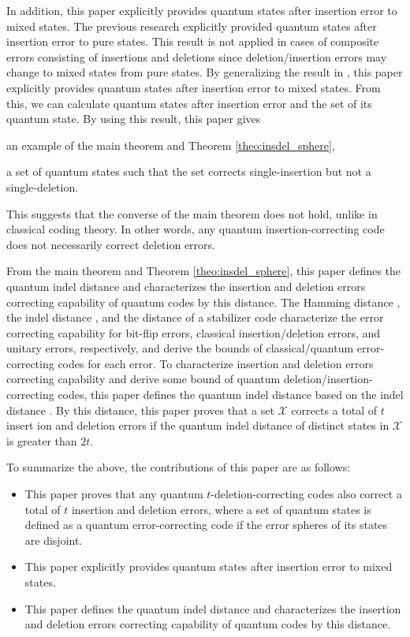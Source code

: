 \documentclass[reprint,amsmath,amssymb,aps,]{revtex4-2}
\theoremstyle{definition}
\newcommand{\1}{\mbox{1}\hspace{-0.25em}\mbox{l}}%
\newcommand{\QU}[1]{\mathcal{#1}}
\begin{document}
In addition,
this paper explicitly provides
quantum states after insertion error to mixed states.
The previous research \cite{sibayama_single_ins_def} 
explicitly provided
quantum states after insertion error to pure states.
This result is not applied
in cases of composite errors consisting of insertions and deletions
since 
deletion/insertion errors
may change
to mixed states
from pure states.
By generalizing the result in \cite{sibayama_single_ins_def},
this paper explicitly provides
quantum states after insertion error to mixed states.
From this,
we can calculate
quantum states after insertion error
and
the set of its quantum state.
By using this result,
this paper gives
\begin{enumerate*}[label={(\roman*)}]
\item an example of the main theorem and Theorem \ref{theo:insdel_sphere},
\item a set of quantum states
  such that
  the set corrects single-insertion
  but
  not a single-deletion.
\end{enumerate*}
This
suggests that
the converse of the main theorem
does not
hold,
unlike in classical coding theory.
In other words,
any quantum insertion-correcting code
does not necessarily
correct
deletion errors.

From the main theorem and Theorem \ref{theo:insdel_sphere},
this paper
defines
the quantum indel distance
and
characterizes the insertion and deletion errors correcting capability of quantum codes
by this distance. 
The Hamming distance \cite{hamming1950error},
the indel distance \cite{levenshtein1966binary}, and
the distance of a stabilizer code \cite{nielsen2016quantum}
characterize
the error correcting capability
for
bit-flip errors,
classical insertion/deletion errors,
and unitary errors,
respectively,
and
derive
the bounds of classical/quantum error-correcting codes
for each error.
To characterize insertion and deletion errors correcting capability
and
derive some bound of quantum deletion/insertion-correcting codes,
this paper
defines
the quantum indel distance
based on the indel distance \cite{levenshtein1966binary}.
By this distance,
this paper
proves that
a set $\QU{X}$ 
corrects
a total of $t$ insert
ion and deletion errors
if
the quantum indel distance of distinct states in $\QU{X}$ 
is
greater than $2t$.

To summarize the above,
the contributions of this paper
are
as follows:
\begin{itemize}
\item
  This paper
  proves that
  any quantum $t$-deletion-correcting codes
  also correct a total of $t$ insertion and deletion errors,
  where
  a set of quantum states is defined as a quantum error-correcting code
  if
  the error spheres of its states are disjoint.
\item  
  This paper explicitly provides
  quantum states after insertion error to mixed states.
\item
  This paper
  defines
  the quantum indel distance
  and
  characterizes the insertion and deletion errors correcting capability of quantum codes
  by this distance. 
\end{itemize}
\end{document}
